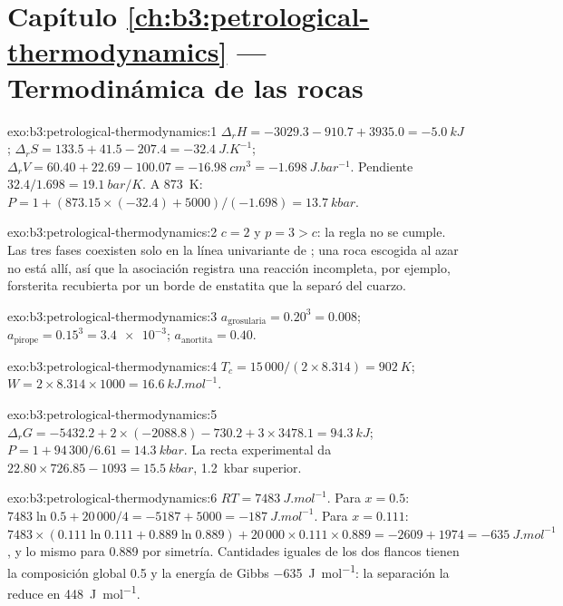 \section*{Capítulo \ref{ch:b3:petrological-thermodynamics} --- Termodinámica de las rocas}

\begin{solution}{exo:b3:petrological-thermodynamics:1}
$\Delta_rH = -3029.3 - 910.7 + 3935.0 = \qty{-5.0}{kJ}$; $\Delta_rS = 133.5 +
41.5 - 207.4 = \qty{-32.4}{J.K^{-1}}$; $\Delta_rV = 60.40 + 22.69 - 100.07 =
\qty{-16.98}{cm^3} = \qty{-1.698}{J.bar^{-1}}$. Pendiente $32.4/1.698 =
\qty{19.1}{bar/K}$. A \qty{873}{K}: $P = 1 + (873.15\times(-32.4) +
5000)/(-1.698) = \qty{13.7}{kbar}$.
\end{solution}

\begin{solution}{exo:b3:petrological-thermodynamics:2}
$c = 2$ y $p = 3 > c$: la regla no se cumple. Las tres fases coexisten solo en
la línea univariante de ; una roca escogida
al azar no está allí, así que la asociación registra una reacción incompleta, por
ejemplo, forsterita recubierta por un borde de enstatita que la separó del
cuarzo.
\end{solution}

\begin{solution}{exo:b3:petrological-thermodynamics:3}
$a_{\text{grosularia}} = 0.20^3 = 0.008$; $a_{\text{pirope}} = 0.15^3 =
\num{3.4e-3}$; $a_{\text{anortita}} = 0.40$.
\end{solution}

\begin{solution}{exo:b3:petrological-thermodynamics:4}
$T_c = 15\,000/(2\times8.314) = \qty{902}{K}$; $W = 2\times8.314\times1000
= \qty{16.6}{kJ.mol^{-1}}$.
\end{solution}

\begin{solution}{exo:b3:petrological-thermodynamics:5}
$\Delta_rG = -5432.2 + 2\times(-2088.8) - 730.2 + 3\times3478.1 =
\qty{94.3}{kJ}$; $P = 1 + 94\,300/6.61 = \qty{14.3}{kbar}$. La
recta experimental da $22.80\times726.85 - 1093 = \qty{15.5}{kbar}$, \qty{1.2}{kbar}
superior.
\end{solution}

\begin{solution}{exo:b3:petrological-thermodynamics:6}
$RT = \qty{7483}{J.mol^{-1}}$. Para $x = 0.5$: $7483\ln0.5 + 20\,000/4 = -5187 +
5000 = \qty{-187}{J.mol^{-1}}$. Para $x = 0.111$: $7483\times(0.111\ln0.111 +
0.889\ln0.889) + 20\,000\times0.111\times0.889 = -2609 + 1974 =
\qty{-635}{J.mol^{-1}}$, y lo mismo para 0.889 por simetría. Cantidades iguales de
los dos flancos tienen la composición global 0.5 y la energía de Gibbs
\qty{-635}{J.mol^{-1}}: la separación la reduce en \qty{448}{J.mol^{-1}}.
\end{solution}


